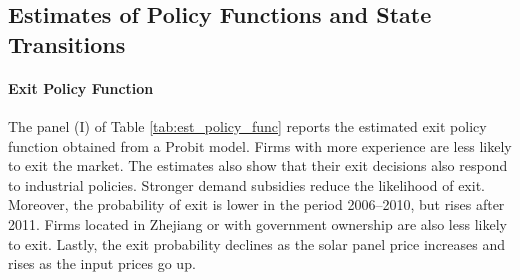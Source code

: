 \documentclass[12pt, letter]{article}
\begin{document}
\subsection{Estimates of Policy Functions and State Transitions}
\label{subsec:est_results_first_stage}

\paragraph{Exit Policy Function}
The panel (I) of Table \ref{tab:est_policy_func} reports the estimated exit policy function obtained from a Probit model. Firms with more experience are less likely to exit the market. The estimates also show that their exit decisions also respond to industrial policies. Stronger demand subsidies reduce the likelihood of exit. Moreover, the probability of exit is lower in the period 2006–2010, but rises after 2011.  Firms located in Zhejiang or with government ownership are also less likely to exit.
Lastly, the exit probability declines as the solar panel price increases and rises as the input prices go up.
\end{document}
